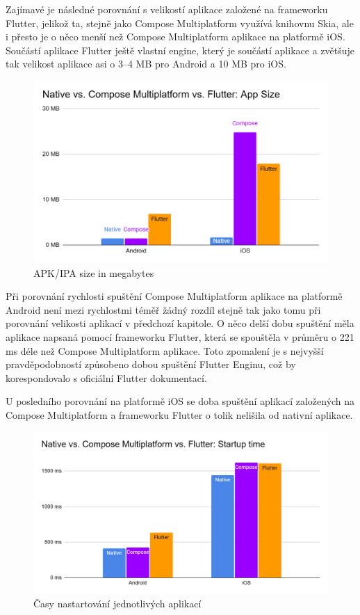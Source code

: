 Zajímavé je následné porovnání s velikostí aplikace založené na frameworku Flutter, jelikož ta, stejně jako Compose
Multiplatform využívá knihovnu Skia, ale i přesto je o něco menší než Compose Multiplatform aplikace na platformě iOS.
Součástí aplikace Flutter ještě vlastní engine, který je součástí aplikace a zvětšuje tak velikost aplikace asi o 3–4 MB pro Android a 10 MB 
pro iOS. \cite{flutterSize}

\begin{figure}[H]
  \centering
  \includegraphics[width=.7\textwidth]{chart_app_sizes.png}
  \caption{APK/IPA size in megabytes}
  \label{fig:chart_app_sizes}
\end{figure}


Při porovnání rychlosti spuštění Compose Multiplatform aplikace na platformě Android není mezi rychlostmi téměř žádný
rozdíl stejně tak jako tomu při porovnání velikosti aplikací v předchozí kapitole. O něco delší dobu spuštění měla
aplikace napsaná pomocí frameworku Flutter, která se spouštěla v průměru o 221 ms déle než Compose Multiplatform aplikace. 
Toto zpomalení je s nejvyšší pravděpodobností způsobeno dobou spuštění Flutter Enginu, což by korespondovalo s oficiální
Flutter dokumentací. \cite{flutterPerformance}

U posledního porovnání na platformě iOS se doba spuštění aplikací založených na Compose Multiplatform a frameworku 
Flutter o tolik nelišila od nativní aplikace.


\begin{figure}[H]
  \centering
  \includegraphics[width=.7\textwidth]{chart_startup_times.png}
  \caption{Časy nastartování jednotlivých aplikací}
  \label{fig:chart_startup_times}
\end{figure}

